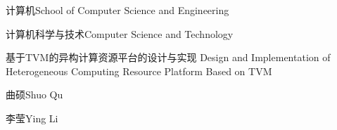 
\school
{计算机}{School of Computer Science and Engineering}

\major
{计算机科学与技术}{Computer Science and Technology}

\thesistitle
{基于TVM的异构计算资源平台的设计与实现}
{}
{Design and Implementation of Heterogeneous Computing Resource Platform Based on TVM}
{}

\thesisauthor
{曲硕}{Shuo Qu}

\teacher
{李莹}{Ying Li}






